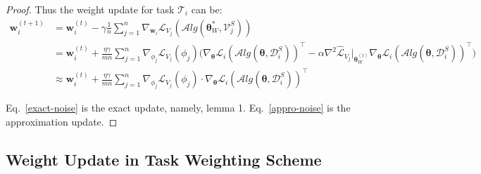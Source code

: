 \begin{proof}
Thus the weight update for task $\mathcal{T}_i$ can be:
\begin{align}
    \mathbf{w}_i^{(t+1)} &= \mathbf{w}_i^{(t)} - \gamma \frac{1}{n} \sum_{j=1}^{n} \nabla_{\mathbf{w}_i} \mathcal{L}_{V_j}(\mathcal{A}lg(\boldsymbol{\theta}^{*}_{W}, \mathcal{V}_j^{S}))\hspace{5cm} \nonumber\\
    &=\mathbf{w}_i^{(t)} + \frac{\eta \gamma}{mn} \sum_{j=1}^{n} \nabla_{\phi_j} \mathcal{L}_{V_j}(\phi_j)  \Big(\nabla_{\boldsymbol{\theta}}\mathcal{L}_i(\mathcal{A}lg(\boldsymbol{\theta}, \mathcal{D}_i^S))^{\intercal}
    - \alpha  \nabla^2\widehat{\mathcal{L}}_{V_j}|_{\boldsymbol{\theta}_{W}^{(t)}} \nabla_{\boldsymbol{\theta}}\mathcal{L}_i(\mathcal{A}lg(\boldsymbol{\theta}, \mathcal{D}_i^S))^{\intercal} \Big) \label{exact-noise}\\
    &\approx \mathbf{w}_i^{(t)} + \frac{\eta \gamma}{mn} \sum_{j=1}^{n} \nabla_{\phi_j} \mathcal{L}_{V_j}(\phi_j) \cdot \nabla_{\boldsymbol{\theta}}\mathcal{L}_i(\mathcal{A}lg(\boldsymbol{\theta}, \mathcal{D}_i^{S}))^{\intercal} \label{appro-noise}
\end{align}

Eq.~\eqref{exact-noise} is the exact update, namely, lemma 1. Eq.~\eqref{appro-noise} is the approximation update.
\end{proof}

\subsection{Weight Update in Task Weighting Scheme}

